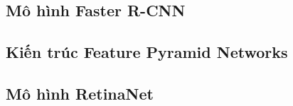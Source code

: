 {    \subsection{Mô hình Faster R-CNN}
    
    \fasterrcnn

    \subsection{Kiến trúc Feature Pyramid Networks}
    
    \fpn

    \subsection{Mô hình RetinaNet}
    
    \retinanet
}